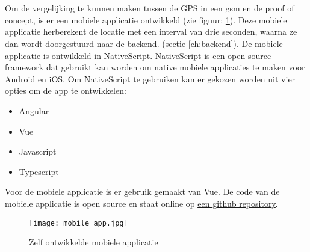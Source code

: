 \section{}
\label{ch:mobileapp}
Om de vergelijking te kunnen maken tussen de GPS in een gsm en de proof of concept, is er een mobiele applicatie ontwikkeld (zie figuur: \ref{fig:mobileapp}). Deze mobiele applicatie herberekent de locatie met een interval van drie seconden, waarna ze dan wordt doorgestuurd naar de backend. (sectie \ref{ch:backend}). De mobiele applicatie is ontwikkeld in \href{https://www.nativescript.org/}{NativeScript}. NativeScript is een open source framework dat gebruikt kan worden om native mobiele applicaties te maken voor Android en iOS. Om NativeScript te gebruiken kan er gekozen worden uit vier opties om de app te ontwikkelen:
\begin{itemize}
	\item Angular
	\item Vue
	\item Javascript
	\item Typescript
\end{itemize}
Voor de mobiele applicatie is er gebruik gemaakt van Vue. De code van de mobiele applicatie is open source en staat online op \underline{\href{https://github.com/IndyVC/bap-gsmtracker}{een github repository}}. 
\begin{figure}
	\texttt{[image: mobile\_app.jpg]}
	\caption{Zelf ontwikkelde mobiele applicatie}
	\label{fig:mobileapp}
\end{figure}